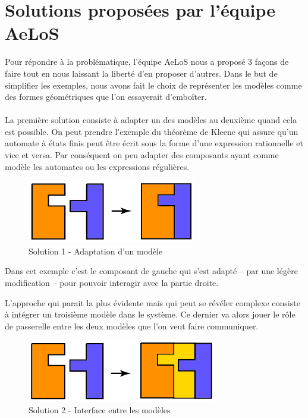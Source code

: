 \documentclass[12pt,a4paper]{report}
\begin{document}
\section{Solutions proposées par l'équipe AeLoS}\label{sec:Solutions}
Pour répondre à la problématique, l'équipe AeLoS nous a proposé 3 façons de 
faire tout en nous laissant la liberté d'en proposer d'autres.
Dans le but de simplifier les exemples, nous avons fait le choix de représenter 
les modèles comme des formes géométriques que l'on essayerait d'emboîter.
\\\\
La première solution consiste à adapter un des modèles au deuxième quand cela 
est possible. On peut prendre l'exemple du théorème de Kleene qui assure qu'un 
automate à états finis peut être écrit sous la forme d'une expression 
rationnelle et vice et versa. Par conséquent on peu adapter des composants
ayant comme modèle les automates ou les expressions régulières.

\begin{figure}[h]
	\centering
	\includegraphics[scale=1]{ressources/solution1.png}
	\caption{Solution 1 - Adaptation d'un modèle}
\end{figure}

Dans cet exemple c'est le composant de gauche qui s'est adapté -- par une 
légère modification -- pour pouvoir interagir avec la partie droite.

\newpage
L'approche qui parait la plus évidente mais qui peut se révéler complexe 
consiste à intégrer un troisième modèle dans le système. Ce dernier va alors 
jouer le rôle de passerelle entre les deux modèles que l'on veut faire 
communiquer.

\begin{figure}[h]
	\centering
	\includegraphics[scale=1]{ressources/solution2.png}
	\caption{Solution 2 - Interface entre les modèles}
\end{figure}
 
\end{document}
